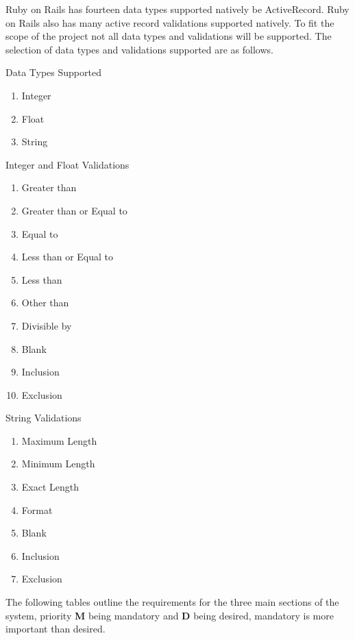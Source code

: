 \documentclass[a4paper,12pt]{article}
\begin{document}
\vspace{3mm}
\par Ruby on Rails has fourteen data types supported natively be ActiveRecord\cite{railsTableType}. Ruby on Rails also has many active record validations supported natively. To fit the scope of the project not all data types and validations will be supported. The selection of data types and validations supported are as follows.
\vspace{3mm}
\par Data Types Supported
\begin{enumerate}
\item Integer
\item Float
\item String
\end{enumerate}
\vspace{3mm}
\par Integer and Float Validations
\begin{enumerate}
\item Greater than
\item Greater than or Equal to
\item Equal to
\item Less than or Equal to
\item Less than
\item Other than
\item Divisible by
\item Blank
\item Inclusion
\item Exclusion
\end{enumerate}
\vspace{3mm}
\par String Validations
\begin{enumerate}
\item Maximum Length
\item Minimum Length
\item Exact Length
\item Format
\item Blank
\item Inclusion
\item Exclusion
\end{enumerate}
\par The following tables outline the requirements for the three main sections of the system, priority \textbf{M} being mandatory and \textbf{D} being desired, mandatory is more important than desired.
\end{document}
